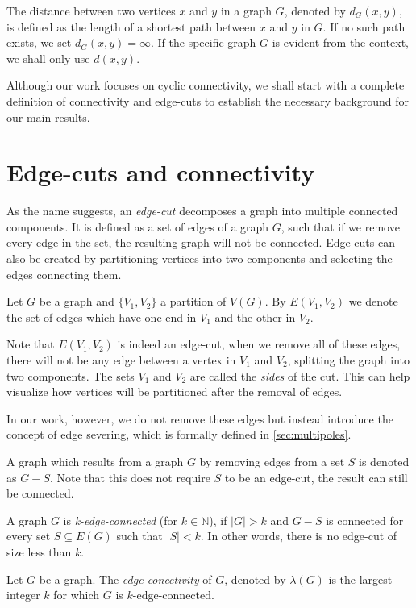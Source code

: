 \documentclass[12pt, twoside]{book}
\begin{document}
The distance between two vertices $x$ and $y$ in a graph $G$, denoted by $d_G(x,y)$, is defined as the length of a shortest path between $x$ and $y$ in $G$. If no such path exists, we set $d_G(x,y)=\infty$. If the specific graph $G$ is evident from the context, we shall only use $d(x,y)$.

Although our work focuses on cyclic connectivity, we shall start with a complete definition of connectivity and edge-cuts to establish the necessary background for our main results.

\section{Edge-cuts and connectivity}\label{sec:edge-cuts}

As the name suggests, an \textit{edge-cut} decomposes a graph into multiple connected components. It is defined as a set of edges of a graph $G$, such that if we remove every edge in the set, the resulting graph will not be connected. Edge-cuts can also be created by partitioning vertices into two components and selecting the edges connecting them.

\begin{definition}
	Let $G$ be a graph and $\{V_1,V_2\}$ a partition of $V(G)$. By $E(V_1,V_2)$ we denote the set of edges which have one end in $V_1$ and the other in $V_2$.
\end{definition}

Note that $E(V_1,V_2)$ is indeed an edge-cut, when we remove all of these edges, there will not be any edge between a vertex in $V_1$ and $V_2$, splitting the graph into two components. The sets $V_1$ and $V_2$ are called the \textit{sides} of the cut. This can help visualize how vertices will be partitioned after the removal of edges.

In our work, however, we do not remove these edges but instead introduce the concept of edge severing, which is formally defined in \cref{sec:multipoles}.

A graph which results from a graph $G$ by removing edges from a set $S$ is denoted as $G-S$. Note that this does not require $S$ to be an edge-cut, the result can still be connected.

A graph $G$ is \textit{k-edge-connected} (for $k\in\mathbb{N}$), if $|G|>k$ and $G-S$ is connected for every set $S\subseteq E(G)$ such that $|S|<k$. In other words, there is no edge-cut of size less than $k$.

\begin{definition}
	Let $G$ be a graph. The \textit{edge-conectivity} of $G$, denoted by $\lambda(G)$ is the largest integer $k$ for which $G$ is $k$-edge-connected.
\end{definition}
\end{document}
